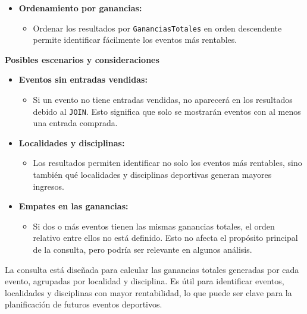 \begin{itemize}
   \item \textbf{Ordenamiento por ganancias:}
   \begin{itemize}
       \item Ordenar los resultados por \texttt{GananciasTotales} en orden descendente permite identificar fácilmente los eventos más rentables.
   \end{itemize}
\end{itemize}

\textbf{Posibles escenarios y consideraciones}

\begin{itemize}
   \item \textbf{Eventos sin entradas vendidas:}
   \begin{itemize}
       \item Si un evento no tiene entradas vendidas, no aparecerá en los resultados debido al \texttt{JOIN}. Esto significa que solo se mostrarán eventos con al menos una entrada comprada.
   \end{itemize}

   \item \textbf{Localidades y disciplinas:}
   \begin{itemize}
       \item Los resultados permiten identificar no solo los eventos más rentables, sino también qué localidades y disciplinas deportivas generan mayores ingresos.
   \end{itemize}

   \item \textbf{Empates en las ganancias:}
   \begin{itemize}
       \item Si dos o más eventos tienen las mismas ganancias totales, el orden relativo entre ellos no está definido. Esto no afecta el propósito principal de la consulta, pero podría ser relevante en algunos análisis.
   \end{itemize}
\end{itemize}

La consulta está diseñada para calcular las ganancias totales generadas por cada evento, agrupadas por localidad y disciplina. Es útil para identificar eventos, localidades y disciplinas con mayor rentabilidad, lo que puede ser clave para la planificación de futuros eventos deportivos.
